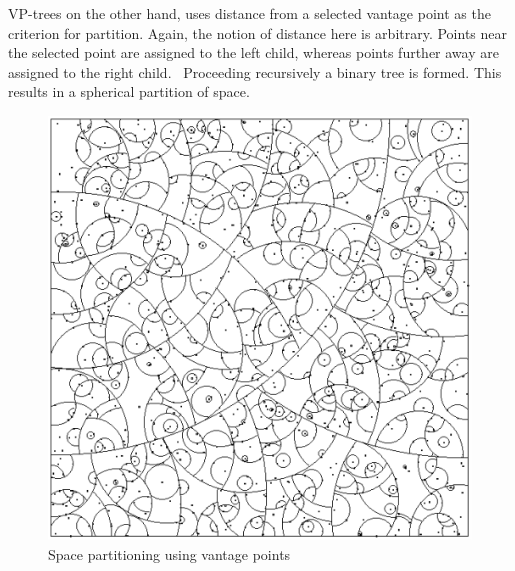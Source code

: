 \documentclass[11pt]{article}
\begin{document}
VP-trees on the other hand, uses distance from a selected vantage point as the criterion for partition. Again, the notion of distance here is arbitrary. Points near the selected point are assigned to the left child, whereas points further away are assigned to the right child.~\cite{Yianilos93} Proceeding recursively a binary tree is formed. This results in a spherical partition of space.
\begin{figure}[h]
\centering
\includegraphics[scale=0.6]{./images/vp-tree.png}
\caption{Space partitioning using vantage points~\cite{Yianilos93}}
\label{fig:vp-tree}
\end{figure}
\end{document}
